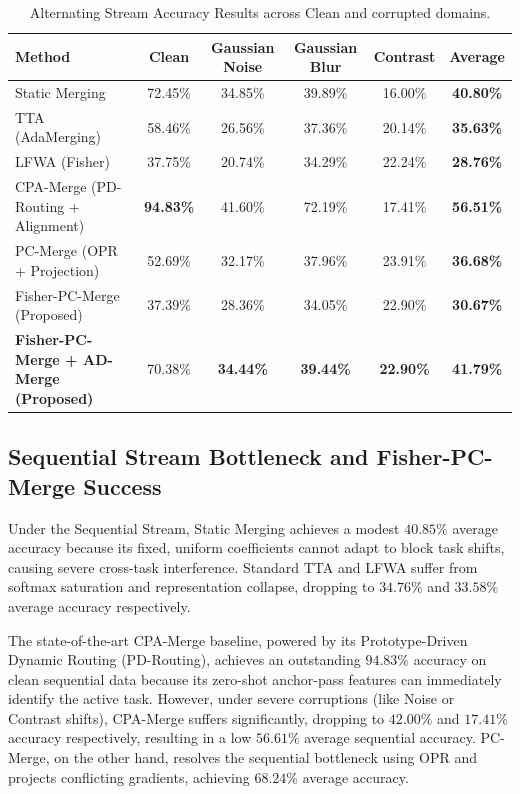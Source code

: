 \documentclass{article}
\theoremstyle{plain}
\theoremstyle{definition}
\theoremstyle{remark}
\begin{document}
\begin{table}[t]
\caption{Alternating Stream Accuracy Results across Clean and corrupted domains.}
\label{tab:alternating_results}
\vskip 0.15in
\begin{center}
\begin{small}
\begin{sc}
\begin{tabular}{lccccc}
\toprule
Method & Clean & Gaussian Noise & Gaussian Blur & Contrast & Average \\
\midrule
Static Merging & 72.45\% & 34.85\% & 39.89\% & 16.00\% & \textbf{40.80\%} \\
TTA (AdaMerging) & 58.46\% & 26.56\% & 37.36\% & 20.14\% & \textbf{35.63\%} \\
LFWA (Fisher) & 37.75\% & 20.74\% & 34.29\% & 22.24\% & \textbf{28.76\%} \\
CPA-Merge (PD-Routing + Alignment) & \textbf{94.83\%} & 41.60\% & 72.19\% & 17.41\% & \textbf{56.51\%} \\
PC-Merge (OPR + Projection) & 52.69\% & 32.17\% & 37.96\% & 23.91\% & \textbf{36.68\%} \\
Fisher-PC-Merge (Proposed) & 37.39\% & 28.36\% & 34.05\% & 22.90\% & \textbf{30.67\%} \\
\textbf{Fisher-PC-Merge + AD-Merge (Proposed)} & 70.38\% & \textbf{34.44\%} & \textbf{39.44\%} & \textbf{22.90\%} & \textbf{41.79\%} \\
\bottomrule
\end{tabular}
\end{sc}
\end{small}
\end{center}
\vskip -0.1in
\end{table}

\subsection{Sequential Stream Bottleneck and Fisher-PC-Merge Success}
Under the Sequential Stream, Static Merging achieves a modest $40.85\%$ average accuracy because its fixed, uniform coefficients cannot adapt to block task shifts, causing severe cross-task interference. Standard TTA and LFWA suffer from softmax saturation and representation collapse, dropping to $34.76\%$ and $33.58\%$ average accuracy respectively. 

The state-of-the-art CPA-Merge baseline, powered by its Prototype-Driven Dynamic Routing (PD-Routing), achieves an outstanding $94.83\%$ accuracy on clean sequential data because its zero-shot anchor-pass features can immediately identify the active task. However, under severe corruptions (like Noise or Contrast shifts), CPA-Merge suffers significantly, dropping to $42.00\%$ and $17.41\%$ accuracy respectively, resulting in a low $56.61\%$ average sequential accuracy. PC-Merge, on the other hand, resolves the sequential bottleneck using OPR and projects conflicting gradients, achieving $68.24\%$ average accuracy. 
\end{document}
